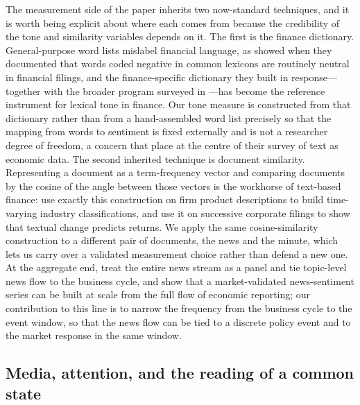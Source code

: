 \documentclass[11pt,a4paper]{article}
\begin{document}
The measurement side of the paper inherits two now-standard techniques, and it is
worth being explicit about where each comes from because the credibility of the
tone and similarity variables depends on it. The first is the finance dictionary.
General-purpose word lists mislabel financial language, as \citet{loughran2011liability}
showed when they documented that words coded negative in common lexicons are
routinely neutral in financial filings, and the finance-specific dictionary they
built in response---together with the broader program surveyed in
\citet{loughran2020textual}---has become the reference instrument for lexical tone
in finance. Our tone measure is constructed from that dictionary rather than from a
hand-assembled word list precisely so that the mapping from words to sentiment is
fixed externally and is not a researcher degree of freedom, a concern that
\citet{gentzkow2019text} place at the centre of their survey of text as economic
data. The second inherited technique is document similarity. Representing a
document as a term-frequency vector and comparing documents by the cosine of the
angle between those vectors is the workhorse of text-based finance:
\citet{hoberg2016text} use exactly this construction on firm product descriptions
to build time-varying industry classifications, and \citet{cohen2020lazy} use it on
successive corporate filings to show that textual change predicts returns. We apply
the same cosine-similarity construction to a different pair of documents, the news
and the minute, which lets us carry over a validated measurement choice rather than
defend a new one. At the aggregate end, \citet{bybee2024business} treat the entire
news stream as a panel and tie topic-level news flow to the business cycle, and
\citet{shapiro2022measuring} show that a market-validated news-sentiment series can
be built at scale from the full flow of economic reporting; our contribution to
this line is to narrow the frequency from the business cycle to the event window,
so that the news flow can be tied to a discrete policy event and to the market
response in the same window.

\subsection{Media, attention, and the reading of a common state}
\end{document}
